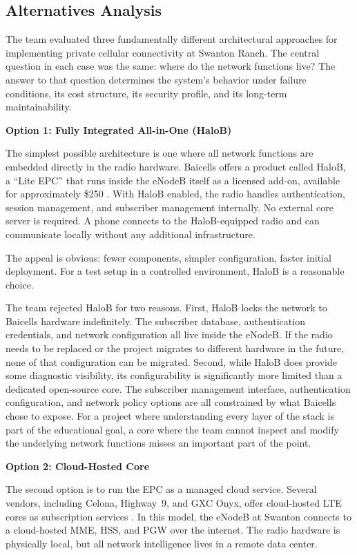\documentclass[
    left=1.5in,
    right=1.25in,
    top=1.25in,
    bottom=1.25in
]{CalPolySeniorProject}
\begin{document}
\subsection{Alternatives Analysis}

The team evaluated three fundamentally different architectural approaches for
implementing private cellular connectivity at Swanton Ranch. The central
question in each case was the same: where do the network functions live? The
answer to that question determines the system's behavior under failure
conditions, its cost structure, its security profile, and its long-term
maintainability.

\textbf{Option 1: Fully Integrated All-in-One (HaloB)}

The simplest possible architecture is one where all network functions are
embedded directly in the radio hardware. Baicells offers a product called
HaloB, a ``Lite EPC'' that runs inside the eNodeB itself as a licensed add-on,
available for approximately \$250 \autocite{houtz2025halo}. With HaloB enabled,
the radio handles authentication, session management, and subscriber management
internally. No external core server is required. A phone connects to the
HaloB-equipped radio and can communicate locally without any additional
infrastructure.

The appeal is obvious: fewer components, simpler configuration, faster initial
deployment. For a test setup in a controlled environment, HaloB is a reasonable
choice.

The team rejected HaloB for two reasons. First, HaloB locks the network to
Baicells hardware indefinitely. The subscriber database, authentication
credentials, and network configuration all live inside the eNodeB. If the radio
needs to be replaced or the project migrates to different hardware in the future,
none of that configuration can be migrated. Second, while HaloB does provide
some diagnostic visibility, its configurability is significantly more limited
than a dedicated open-source core. The subscriber management interface,
authentication configuration, and network policy options are all constrained by
what Baicells chose to expose. For a project where understanding every layer of
the stack is part of the educational goal, a core where the team cannot inspect
and modify the underlying network functions misses an important part of the
point.

\textbf{Option 2: Cloud-Hosted Core}

The second option is to run the EPC as a managed cloud service. Several vendors,
including Celona, Highway~9, and GXC Onyx, offer cloud-hosted LTE cores as
subscription services \autocite{houtz2026wlpc}. In this model, the eNodeB at
Swanton connects to a cloud-hosted MME, HSS, and PGW over the internet. The
radio hardware is physically local, but all network intelligence lives in a
remote data center.
\end{document}
